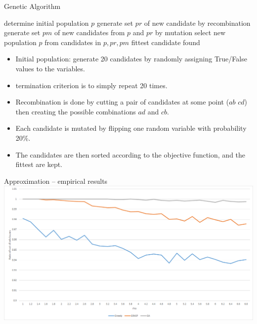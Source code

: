 \documentclass[aspectratio=169, compress, xcolor=table,xcolor=dvipsnames]{beamer}
\begin{document}
\begin{frame}
	{Genetic Algorithm}
	\begin{algorithmic}[1]\sffamily
		\State determine initial population $p$
		\State generate set $pr$ of new candidate by recombination
		\State generate set $pm$ of new candidates from $p$ and $pr$ by mutation
		\State select new population $p$ from candidates in $p, pr, pm$
		\EndWhile
		\State \Return fittest candidate found
	\end{algorithmic}

\begin{itemize}
	\item Initial population: generate 20 candidates by randomly assigning True/False values to the variables.
	\item termination criterion is to simply repeat 20 times.
	\item Recombination is done by cutting a pair of candidates at some point ($ab$ $cd$) then creating the possible combinations $ad$ and $cb$.
	\item Each candidate is mutated by flipping one random variable with probability 20\%.
	\item The candidates are then sorted according to the objective function, and the fittest are kept.
\end{itemize}

\end{frame}

\begin{frame}
	{Approximation -- empirical results}
	\includegraphics[width=\textwidth]{img/approx}
\end{frame}
\end{document}
